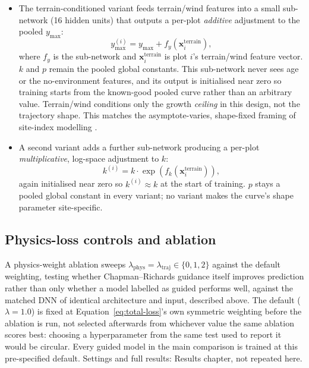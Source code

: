\documentclass[11pt,a4paper]{report}
\begin{document}
\begin{itemize}
\setlength\itemsep{0pt}
\item The terrain-conditioned variant feeds terrain/wind features into a small sub-network
  (16 hidden units) that outputs a per-plot \emph{additive} adjustment to the pooled $y_{\max}$:
  \begin{equation}
  y_{\max}^{(i)} = y_{\max} + f_{y}\!\left(\mathbf{x}^{\text{terrain}}_i\right),
  \label{eq:ymax-adjust}
  \end{equation}
  where $f_y$ is the sub-network and $\mathbf{x}^{\text{terrain}}_i$ is plot $i$'s terrain/wind
  feature vector. $k$ and $p$ remain the pooled global constants. This sub-network never sees age
  or the no-environment features, and its output is initialised near zero so training starts from
  the known-good pooled curve rather than an arbitrary value. Terrain/wind conditions only the
  growth \emph{ceiling} in this design, not the trajectory shape. This matches the
  asymptote-varies, shape-fixed framing of site-index modelling
  \citep{socha2021}. %
\item A second variant adds a further sub-network producing a per-plot \emph{multiplicative},
  log-space adjustment to $k$:
  \begin{equation}
  k^{(i)} = k \cdot \exp\!\left(f_{k}\!\left(\mathbf{x}^{\text{terrain}}_i\right)\right),
  \label{eq:k-adjust}
  \end{equation}
  again initialised near zero so $k^{(i)}\approx k$ at the start of training. $p$ stays a pooled
  global constant in every variant; no variant makes the curve's shape parameter site-specific.
\end{itemize}

\subsection{Physics-loss controls and ablation}

A physics-weight ablation sweeps $\lambda_{\text{phys}}=\lambda_{\text{traj}}\in\{0,1,2\}$ against
the default weighting, testing whether Chapman--Richards guidance itself improves prediction
rather than only whether a model labelled as guided performs well, against the matched DNN of
identical architecture and input, described above. The default ($\lambda=1.0$) is fixed at
Equation~\ref{eq:total-loss}'s own symmetric weighting before the ablation is run, not selected
afterwards from whichever value the same ablation scores best: choosing a hyperparameter from the
same test used to report it would be circular. Every guided model in the main comparison is
trained at this pre-specified default. Settings and full results: Results chapter, not repeated
here.
\end{document}
